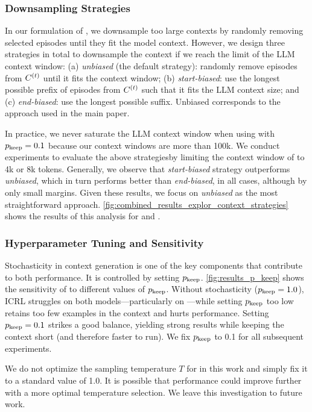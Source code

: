 \subsubsection{Downsampling Strategies}

In our formulation of \explorative, we downsample too large contexts by randomly removing selected episodes until they fit the model context. However, we design three strategies in total to downsample the context if we reach the limit of the LLM context window: (a) \textit{unbiased} (the default strategy): randomly remove episodes from $C^{(t)}$ until it fits the context window; (b) \textit{start-biased}: use the longest possible prefix of episodes from $C^{(t)}$ such that it fits the LLM context size; and (c) \textit{end-biased}: use the longest possible suffix. Unbiased corresponds to the approach used in the main paper. 

In practice, we never saturate the LLM context window when using \explorative with $p_\text{keep}=0.1$ because our context windows are more than 100k. 
We conduct experiments to evaluate the above strategiesby limiting the context window of \llama to 4k or 8k tokens. 
Generally, we observe that \textit{start-biased} strategy outperforms \textit{unbiased}, which in turn performs better than \textit{end-biased}, in all cases, although by only small margins. Given these results, we focus on \textit{unbiased} as the most straightforward approach.
\autoref{fig:combined_results_explor_context_strategies} shows the results of this analysis for \banking and \clinic. 

\subsubsection{Hyperparameter Tuning and Sensitivity}

Stochasticity in context generation is one of the key components that contribute to both \expshort performance. It is controlled by setting $p_\text{keep}$. \autoref{fig:results_p_keep} shows the sensitivity of \expshort to different values of $p_\text{keep}$. Without stochasticity ($p_\text{keep} = 1.0$), ICRL struggles on both models—particularly on \phillm—while setting $p_\text{keep}$ too low retains too few examples in the context and hurts performance. Setting $p_\text{keep} = 0.1$ strikes a good balance, yielding strong results while keeping the context short (and therefore faster to run). We fix $p_\text{keep}$ to 0.1 for all subsequent \expshort experiments.

We do not optimize the sampling temperature $T$ for \expshort in this work and simply fix it to a standard value of 1.0. It is possible that performance could improve further with a more optimal temperature selection. We leave this investigation to future work.

